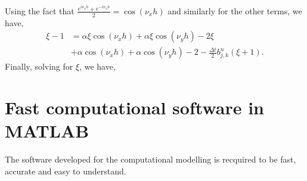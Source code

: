 Using the fact that $ \frac{e^{i \nu_x h}+  e^{-i \nu_x h}}{2} = \cos(\nu_x h)$ and similarly for
the other terms, we have,
\begin{equation*}
    \begin{split}
        \xi - 1 &=
         \alpha \xi \cos(\nu_x h) 
       + \alpha \xi \cos(\nu_y h) 
       -2 \xi   \\
       &+\alpha \cos(\nu_x h) 
       + \alpha \cos(\nu_y h) 
       -2
       -\frac{\Delta t}{2} b_{j,k}^{n} (\xi + 1).
    \end{split}
\end{equation*}
Finally, solving for $\xi$, we have,
\begin{equation*}
    
\end{equation*}


\section{ Fast computational software in MATLAB }
The software developed for the computational modelling is recquired
to be fast, accurate and easy to understand.









